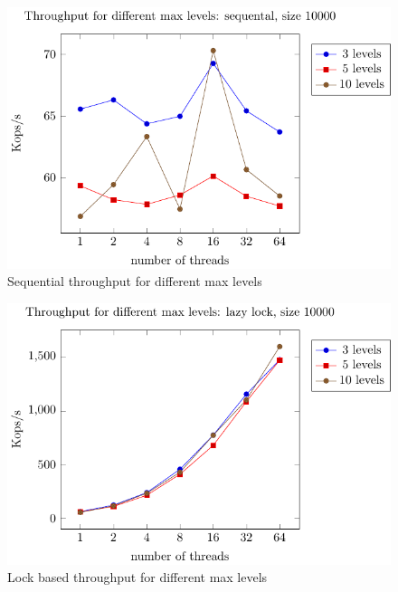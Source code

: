 \documentclass{article}
\begin{document}
\begin{figure}[H]
    \centering
    \includegraphics[width=\textwidth]{plots_for_report/seq_levels_plot.pdf}
    \caption{Sequential throughput for different max levels}
    \label{fig:seq_levels}
\end{figure}
\begin{figure}[H]
    \centering
    \includegraphics[width=\textwidth]{plots_for_report/lock_levels_plot.pdf}
    \caption{Lock based throughput for different max levels}
    \label{fig:lock_levels}
\end{figure}
\end{document}
